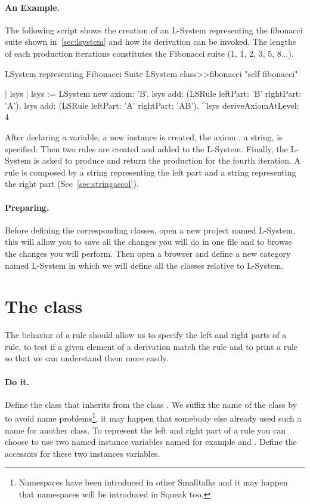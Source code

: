 \paragraph{An Example.} The following script shows the creation of an 
L-System representing the fibonacci suite shown in~\ref{sec:lsystem}
and how its derivation can be invoked. The lengths of each production
iterations constitutes the Fibonacci suite (1, 1, 2, 3, 5, 8...).

\begin{scriptwithtitle}{LSystem representing Fibonacci Suite}\label{scr:fibo}
LSystem class>>fibonacci
   "self fibonacci"

   | lsys |
   lsys := LSystem  new axiom: 'B'.
   lsys add: (LSRule leftPart: 'B' rightPart: 'A').
   lsys add: (LSRule leftPart: 'A' rightPart: 'AB').
   ^lsys deriveAxiomAtLevel: 4
\end{scriptwithtitle}

After declaring a variable, a new  instance is created,
the axiom , a string, is specified. Then two rules are created
and added to the L-System. Finally, the L-System is asked to produce
and return the production for the fourth iteration.  A rule is
composed by a string representing the left part and a string
representing the right part (See~\ref{sec:stringascol}).

\paragraph{Preparing.} Before defining the corresponding classes, 
open a new project named L-System, this will allow you to save all the
changes you will do in one file and to browse the changes you will
perform. Then open a browser and define a new category
 named L-System in which we will define all the
classes relative to L-System.


\section{The  class}\label{sec:ruleclass}
The behavior of a rule should allow us to specify the left and right
parts of a rule, to test if a given element of a derivation match the
rule and to print a rule so that we can understand them more easily.

\paragraph{Do it.} Define the class  that inherits from the 
class . We suffix the name of the class by  to avoid
name problems\footnote{Namespaces have been introduced in other
Smalltalks and it may happen that namespaces will be introduced in
Squeak too.}, it may happen that somebody else already used such a
name for another class. To represent the left and right part of a rule
you can choose to use two named instance variables named for example
 and .  Define the accessors for these two instances
variables.


